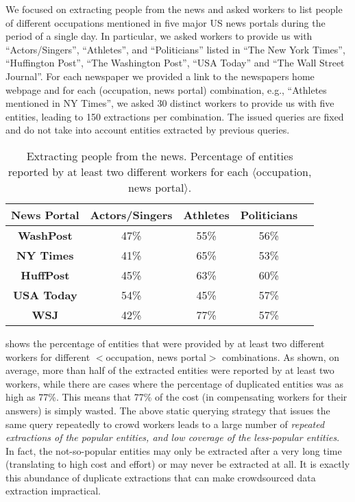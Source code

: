 \begin{example}
\color{red}We focused on extracting people from the news and asked workers to list people of different occupations mentioned in five major US news portals during the period of a single day. In particular, we asked workers to provide us with ``Actors/Singers'', ``Athletes'', and ``Politicians'' listed in ``The New York Times'',  ``Huffington Post'', ``The Washington Post'', ``USA  Today'' and ``The Wall Street Journal''. For each newspaper we provided a link to the newspapers home webpage and for each (occupation, news portal) combination, e.g., ``Athletes mentioned in NY Times'', we asked 30 distinct workers to provide us with five entities, leading to 150 extractions per combination. The issued queries are fixed and do not take into account entities extracted by previous queries.
\end{example}
\vspace{-5pt}
\begin{table}
\center
\caption{Extracting people from the news. Percentage of entities reported by at least two different workers for each $\langle$occupation, news portal$\rangle$.}
\label{tab:duplicates}
\begin{tabular}{|c|c|c|c|c|}
\hline
News Portal & {\bf Actors/Singer}s & {\bf Athletes} & \textbf{Politicians}\\ \hline
{\bf WashPost} & 47\% & 55\% & 56\% \\
{\bf NY Times} & 41\%& 65\% & 53\% \\
{\bf HuffPost} & 45\% & 63\% & 60\% \\
{\bf USA Today} & 54\% & 45\% & 57\% \\
{\bf WSJ} & 42\% & 77\% & 57\% \\
\hline
\end{tabular}
\end{table}

 shows the percentage of entities that were provided by at least two different workers for different $<$occupation, news portal$>$ combinations. As shown, on average, more than half of the extracted entities were reported by at least two workers, while there are cases where the percentage of duplicated entities was as high as 77\%. This means that 77\% of the cost (in compensating workers for their answers) is simply wasted. The above static querying strategy that issues the same query repeatedly to crowd workers leads to a large number of {\em repeated extractions of the popular entities, and low coverage of the less-popular entities}. In fact, the not-so-popular entities may only be extracted after a very long time (translating to high cost and effort) or may never be extracted at all. It is exactly this abundance of duplicate extractions that can make crowdsourced data extraction impractical.

